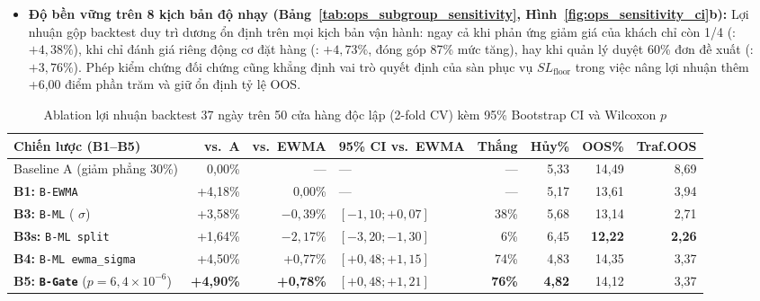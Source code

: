 \begin{itemize}
    \item \textbf{Độ bền vững trên 8 kịch bản độ nhạy (Bảng~\ref{tab:ops_subgroup_sensitivity}, Hình~\ref{fig:ops_sensitivity_ci}b):} Lợi nhuận gộp backtest duy trì dương ổn định trên mọi kịch bản vận hành: ngay cả khi phản ứng giảm giá của khách chỉ còn 1/4 (: $+4{,}38\%$), khi chỉ đánh giá riêng động cơ đặt hàng (: $+4{,}73\%$, đóng góp 87\% mức tăng), hay khi quản lý duyệt 60\% đơn đề xuất (: $+3{,}76\%$). Phép kiểm chứng đối chứng  cũng khẳng định vai trò quyết định của sàn phục vụ $SL_{\text{floor}}$ trong việc nâng lợi nhuận thêm +6,00 điểm phần trăm và giữ ổn định tỷ lệ OOS.
\end{itemize}

\begin{table}[H]
\centering
\caption{Ablation lợi nhuận backtest 37 ngày trên 50 cửa hàng độc lập (2-fold CV) kèm 95\% Bootstrap CI và Wilcoxon $p$}
\label{tab:ops_chest_backtest}
\footnotesize
\setlength{\tabcolsep}{3pt}
\begin{tabularx}{\textwidth}{Y r r L{2.35cm} r r r r}
\toprule
\textbf{Chiến lược (B1--B5)} & \textbf{vs.\ A} & \textbf{vs.\ EWMA} & \textbf{95\% CI vs.\ EWMA} & \textbf{Thắng} & \textbf{Hủy\%} & \textbf{OOS\%} & \textbf{Traf.OOS} \\
\midrule
Baseline A (giảm phẳng 30\%) & 0,00\% & --- & --- & --- & 5,33 & 14,49 & 8,69 \\
\textbf{B1:} \texttt{B-EWMA} & +4,18\% & 0,00\% & --- & --- & 5,17 & 13,61 & 3,94 \\
\textbf{B3:} \texttt{B-ML} ( $\sigma$) & +3,58\% & $-0{,}39\%$ & $[-1{,}10; +0{,}07]$ & 38\% & 5,68 & 13,14 & 2,71 \\
\textbf{B3s:} \texttt{B-ML split} & +1,64\% & $-2{,}17\%$ & $[-3{,}20; -1{,}30]$ & 6\% & 6,45 & \textbf{12,22} & \textbf{2,26} \\
\textbf{B4:} \texttt{B-ML ewma\_sigma} & +4,50\% & +0,77\% & $[+0{,}48; +1{,}15]$ & 74\% & 4,83 & 14,35 & 3,37 \\
\textbf{B5:} \textbf{\texttt{B-Gate}} ($p=6{,}4\times 10^{-6}$) & \textbf{+4,90\%} & \textbf{+0,78\%} & \textbf{$[+0{,}48; +1{,}21]$} & \textbf{76\%} & \textbf{4,82} & 14,12 & 3,37 \\
\bottomrule
\end{tabularx}
\end{table}

